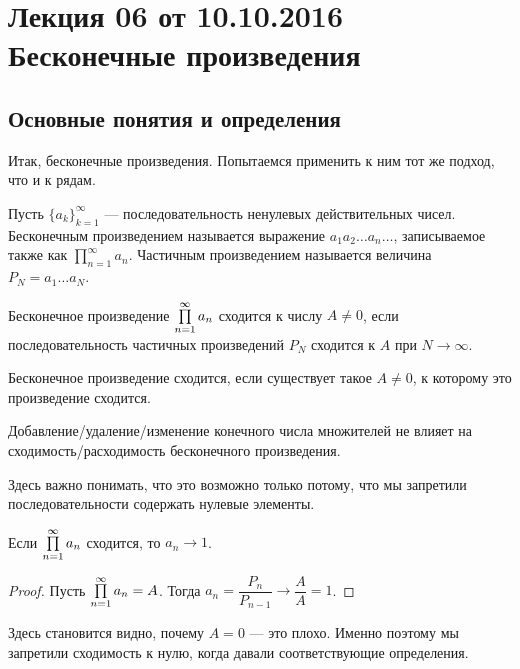 \section{Лекция 06 от 10.10.2016 \\ Бесконечные произведения}
\subsection{Основные понятия и определения}
Итак, бесконечные произведения. Попытаемся применить к ним тот же подход, что и к рядам.

\begin{Def}
Пусть $\{a_k\}_{k=1}^\infty$ --- последовательность ненулевых действительных чисел. Бесконечным произведением называется выражение $a_1 a_2 \ldots a_n \ldots$, записываемое также как $\prod\limits_{n=1}^{\infty}a_n$. Частичным произведением называется величина $P_N = a_1 \ldots a_N$.
\end{Def}

\begin{Def}
Бесконечное произведение $\prod\limits_{n=1}^{\infty} a_n$ сходится к числу $A \neq 0$, если последовательность частичных произведений $P_N$ сходится к $A$ при $N \to \infty$.
\end{Def}

\begin{Def}
Бесконечное произведение сходится, если существует такое $A \neq 0$, к которому это произведение сходится.
\end{Def}

\begin{Statement}
Добавление/удаление/изменение конечного числа множителей не влияет на сходимость/расходимость бесконечного произведения.
\end{Statement}

Здесь важно понимать, что это возможно только потому, что мы запретили последовательности содержать нулевые элементы.

\begin{Statement}
Если $\prod\limits_{n=1}^{\infty} a_n$ сходится, то $a_n \to 1$.
\end{Statement}

\begin{proof}
Пусть $\prod\limits_{n=1}^{\infty} a_n = A$. Тогда $a_n = \dfrac{P_n}{P_{n-1}} \to \dfrac{A}{A} = 1$.
\end{proof}

Здесь становится видно, почему $A=0$ --- это плохо. Именно поэтому мы запретили сходимость к нулю, когда давали соответствующие определения.

